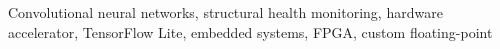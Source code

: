 \begin{keywords}
Convolutional neural networks, structural health monitoring, hardware accelerator, TensorFlow Lite, embedded systems, FPGA, custom floating-point
\end{keywords}

\titlepgskip=-15pt

\maketitle
